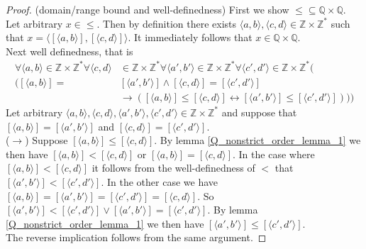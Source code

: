\documentclass{report}
\begin{document}
\begin{proof}(domain/range bound and well-definedness) First we show $\leq\subseteq\mathbb Q\times\mathbb Q$. 
Let arbitrary $x\in\leq$. Then by definition there exists $\langle a,b\rangle,\langle c,d\rangle\in\mathbb Z\times\mathbb Z^*$ such that $x=\langle[\langle a,b\rangle],[\langle c,d\rangle]\rangle$.
It immediately follows that $x\in\mathbb Q\times\mathbb Q$.\\
\indent Next well definedness, that is
\begin{align*}
\forall\langle a,b\rangle\in\mathbb Z\times\mathbb Z^*\forall\langle c,d\rangle&\in\mathbb Z\times\mathbb Z^*
\forall\langle a',b'\rangle\in\mathbb Z\times\mathbb Z^*\forall\langle c',d'\rangle\in\mathbb Z\times\mathbb Z^*(\\
([\langle a,b\rangle]=&[\langle a',b'\rangle]\land[\langle c,d\rangle]=[\langle c',d'\rangle]\\
&\to([\langle a,b\rangle]\leq[\langle c,d\rangle]\leftrightarrow[\langle a',b'\rangle]\leq[\langle c',d'\rangle])))
\end{align*}
Let arbitrary $\langle a,b\rangle,\langle c,d\rangle,\langle a',b'\rangle,\langle c',d'\rangle\in\mathbb Z\times\mathbb Z^*$ and suppose that
$[\langle a,b\rangle]=[\langle a',b'\rangle]$ and $[\langle c,d\rangle]=[\langle c',d'\rangle]$.\\
\indent($\rightarrow$) Suppose $[\langle a,b\rangle]\leq[\langle c,d\rangle]$. By 
lemma \ref{Q_nonstrict_order_lemma_1} we then have $[\langle a,b\rangle]<[\langle c,d\rangle]$ or
$[\langle a,b\rangle]=[\langle c,d\rangle]$. In the case where $[\langle a,b\rangle]<[\langle c,d\rangle]$ it follows from the well-definedness of $<$ that 
$[\langle a',b'\rangle]<[\langle c',d'\rangle]$. In the other case we have 
$[\langle a,b\rangle]=[\langle a',b'\rangle]=[\langle c',d'\rangle]=[\langle c,d\rangle]$. So 
$[\langle a',b'\rangle]<[\langle c',d'\rangle]\lor[\langle a',b'\rangle]=[\langle c',d'\rangle]$.
By lemma \ref{Q_nonstrict_order_lemma_1} we then have $[\langle a',b'\rangle]\leq[\langle c',d'\rangle]$.\\
\indent The reverse implication follows from the same argument.
\end{proof}
\newpage
\end{document}
